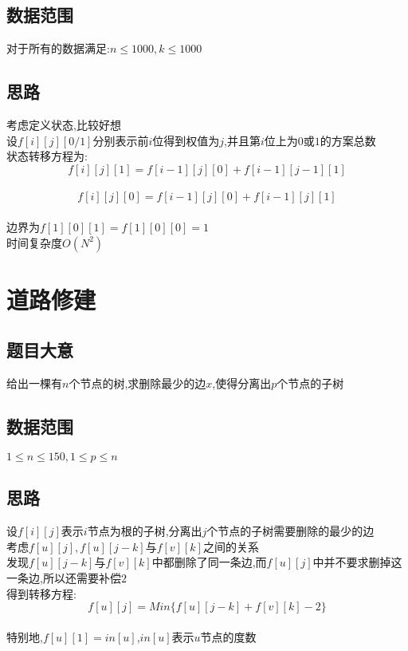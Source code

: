 \documentclass{ctexart}
\numberwithin{equation}{section}
\begin{document}
\begin{flushleft}
  \subsection{数据范围}
  对于所有的数据满足:$n \le 1000,k \le 1000$ \\
  \subsection{思路}
  考虑定义状态,比较好想 \\
  设$f[i][j][0/1]$分别表示前$i$位得到权值为$j$,并且第$i$位上为$0$或$1$的方案总数 \\
  状态转移方程为:\\
  $$f[i][j][1] = f[i-1][j][0]+f[i-1][j-1][1]$$ \\
  $$f[i][j][0] = f[i-1][j][0]+f[i-1][j][1]$$ \\
  边界为$f[1][0][1] = f[1][0][0]=1$ \\
  时间复杂度$O(N^2)$ \\

  \newpage

  \section{道路修建} 
  \subsection{题目大意}
  给出一棵有$n$个节点的树,求删除最少的边$x$,使得分离出$p$个节点的子树 \\
  \subsection{数据范围}
  $ 1\le n \le 150,1\le p \le n$ \\
  \subsection{思路}
  设$f[i][j]$表示$i$节点为根的子树,分离出$j$个节点的子树需要删除的最少的边\\
  考虑$f[u][j],f[u][j-k]$与$f[v][k]$之间的关系 \\
  发现$f[u][j-k]$与$f[v][k]$中都删除了同一条边,而$f[u][j]$中并不要求删掉这一条边,所以还需要补偿$2$ \\
  得到转移方程:$$f[u][j] = Min\{f[u][j-k]+f[v][k]-2\}$$ \\
  特别地,$f[u][1]=in[u]$,$in[u]$表示$u$节点的度数 \\


\end{flushleft}
\end{document}
